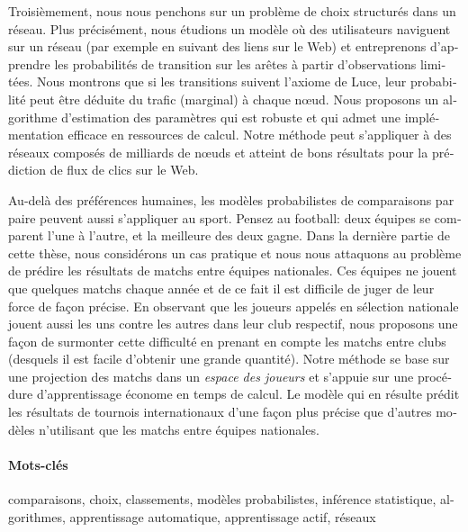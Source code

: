 \begin{otherlanguage}{french}
	Troisièmement, nous nous penchons sur un problème de choix structurés dans un réseau.
	Plus précisément, nous étudions un modèle où des utilisateurs naviguent sur un réseau (par exemple en suivant des liens sur le Web) et entreprenons d'apprendre les probabilités de transition sur les arêtes à partir d'observations limitées.
	Nous montrons que si les transitions suivent l'axiome de Luce, leur probabilité peut être déduite du trafic (marginal) à chaque nœud.
	Nous proposons un algorithme d'estimation des paramètres qui est robuste et qui admet une implémentation efficace en ressources de calcul.
	Notre méthode peut s'appliquer à des réseaux composés de milliards de nœuds et atteint de bons résultats pour la prédiction de flux de clics sur le Web.

	Au-delà des préférences humaines, les modèles probabilistes de comparaisons par paire peuvent aussi s'appliquer au sport.
	Pensez au football: deux équipes se comparent l'une à l'autre, et la meilleure des deux gagne.
	Dans la dernière partie de cette thèse, nous considérons un cas pratique et nous nous attaquons au problème de prédire les résultats de matchs entre équipes nationales.
	Ces équipes ne jouent que quelques matchs chaque année et de ce fait il est difficile de juger de leur force de façon précise.
	En observant que les joueurs appelés en sélection nationale jouent aussi les uns contre les autres dans leur club respectif, nous proposons une façon de surmonter cette difficulté en prenant en compte les matchs entre clubs (desquels il est facile d'obtenir une grande quantité).
	Notre méthode se base sur une projection des matchs dans un \emph{espace des joueurs} et s'appuie sur une procédure d'apprentissage économe en temps de calcul.
	Le modèle qui en résulte prédit les résultats de tournois internationaux d'une façon plus précise que d'autres modèles n'utilisant que les matchs entre équipes nationales.

	\paragraph{Mots-clés}
	comparaisons, choix, classements, modèles probabilistes, inférence statistique, algorithmes, apprentissage automatique, apprentissage actif, réseaux
\end{otherlanguage}
